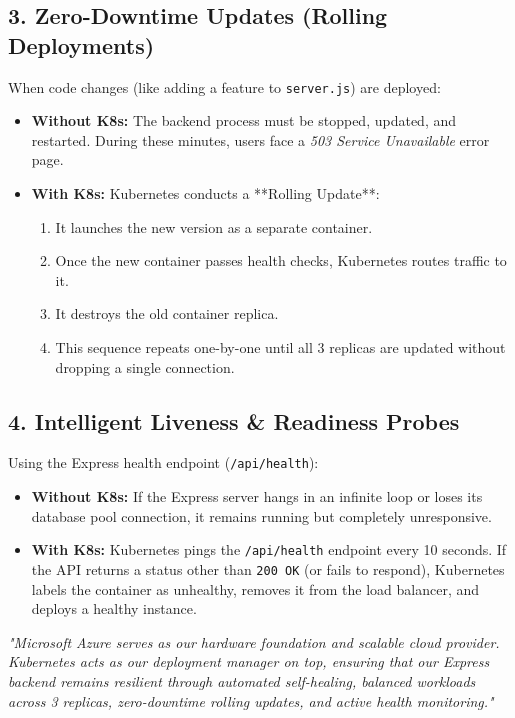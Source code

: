 \documentclass[11pt,a4paper]{article}
\begin{document}
\newpage

\subsection{3. Zero-Downtime Updates (Rolling Deployments)}
When code changes (like adding a feature to \texttt{server.js}) are deployed:
\begin{itemize}
    \item \textbf{Without K8s:} The backend process must be stopped, updated, and restarted. During these minutes, users face a \textit{503 Service Unavailable} error page.
    \item \textbf{With K8s:} Kubernetes conducts a **Rolling Update**:
    \begin{enumerate}
        \item It launches the new version as a separate container.
        \item Once the new container passes health checks, Kubernetes routes traffic to it.
        \item It destroys the old container replica.
        \item This sequence repeats one-by-one until all 3 replicas are updated without dropping a single connection.
    \end{enumerate}
\end{itemize}

\subsection{4. Intelligent Liveness \& Readiness Probes}
Using the Express health endpoint (\texttt{/api/health}):
\begin{itemize}
    \item \textbf{Without K8s:} If the Express server hangs in an infinite loop or loses its database pool connection, it remains running but completely unresponsive.
    \item \textbf{With K8s:} Kubernetes pings the \texttt{/api/health} endpoint every 10 seconds. If the API returns a status other than \texttt{200 OK} (or fails to respond), Kubernetes labels the container as unhealthy, removes it from the load balancer, and deploys a healthy instance.
\end{itemize}

\begin{tcolorbox}[
    colback=bglight,
    colframe=accentgreen,
    arc=6pt,
    boxrule=1.5pt,
    title=\textbf{\color{white}🔒 Summary for Your Presentation}
]
    \centering
    \small\itshape
    "Microsoft Azure serves as our hardware foundation and scalable cloud provider. Kubernetes acts as our deployment manager on top, ensuring that our Express backend remains resilient through automated self-healing, balanced workloads across 3 replicas, zero-downtime rolling updates, and active health monitoring."
\end{tcolorbox}
\end{document}
